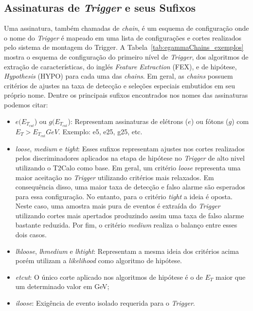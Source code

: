 \subsection{Assinaturas de \textit{Trigger} e seus Sufixos}

Uma assinatura, também chamadas de \textit{chain}, é um esquema de configuração onde o nome do \textit{Trigger} é mapeado em uma lista de configurações e cortes realizados pelo sistema
de montagem do Trigger. A Tabela~\ref{tab:egammaChains_exemplos} mostra o esquema de configuração do primeiro nível de \textit{Trigger}, dos algoritmos de extração de 
características, do inglés \textit{Feature Extraction} (FEX), e de hipótese, \textit{Hypothesis} (HYPO)  para cada uma das \textit{chains}.  
Em geral, as \textit{chains} possuem critérios de ajustes na taxa de detecção e seleções especiais embutidos em seu próprio nome. Dentre os principais sufixos encontrados nos nomes das 
assinaturas podemos citar: 

\begin{itemize}

\item $e(E_{T_{cut}}$) ou $g(E_{T_{cut}}$): Representam assinaturas de elétrons ($e$) ou fótons ($g$) com $E_{T} > E_{T_{cut}} GeV$. Exemplo: e5, e25, g25, etc.

\item \textit{loose}, \textit{medium} e \textit{tight}: Esses sufixos representam ajustes nos cortes realizados pelos discriminadores aplicados na etapa de hipótese no \textit{Trigger} de alto nivel utilizando 
o T2Calo como base. Em geral, um critério \textit{loose} representa uma maior aceitação no \textit{Trigger} utilizando critérios mais relaxados. Em consequência disso, uma maior taxa de detecção e 
falso alarme são esperados para essa configuração. No entanto, para o critério \textit{tight} a ideia é oposta. Neste caso, uma amostra mais pura de eventos é extraída do \textit{Trigger} utilizando cortes mais 
apertados produzindo assim uma taxa de falso alarme bastante reduzida. Por fim, o critério \textit{medium} realiza o balanço entre esses dois casos.

\item \textit{lhloose}, \textit{lhmedium} e \textit{lhtight}: Representam a mesma ideia dos critérios acima porém utilizam a \textit{likelihood} como algoritmo de hipótese.

\item \textit{etcut}: O único corte aplicado nos algoritmos de hipótese é o de $E_{T}$ maior que um determinado valor em GeV;

\item \textit{iloose}: Exigência de evento isolado requerida para o \textit{Trigger}.

\end{itemize}


